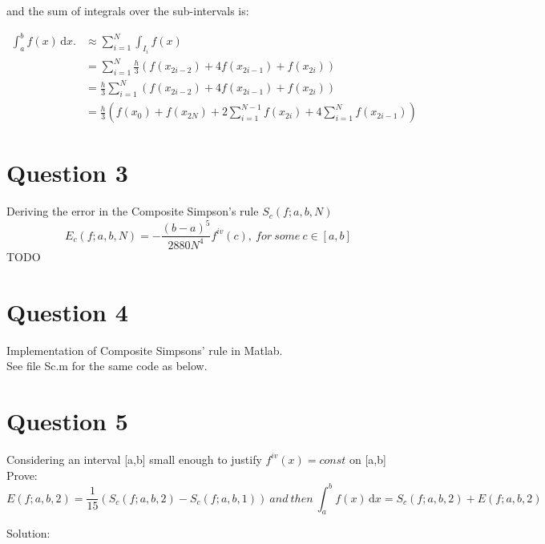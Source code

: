 \documentclass[fleqn]{report}
\begin{document}
and the sum of integrals over the sub-intervals is:

\begin{equation*}
\begin{split}
\int_a^b \! f(x) \,\mathrm{d}x. & \approx  \sum_{i=1}^{N} \int_{I_i} \! f(x) \,\\
& = \sum_{i=1}^{N} \frac{h}{3}(f(x_{2i-2}) + 4f(x_{2i-1}) + f(x_{2i}))\\
& = \frac{h}{3} \sum_{i=1}^{N} (f(x_{2i-2}) + 4f(x_{2i-1}) + f(x_{2i}))\\
& = \frac{h}{3} (f(x_0) + f(x_{2N}) +  2\sum_{i=1}^{N-1} f(x_{2i}) + 4\sum_{i=1}^{N} f(x_{2i-1}))
\end{split}
\end{equation*}    

\pagebreak

\section{Question 3}
Deriving the error in the Composite Simpson's rule $S_c(f;a,b,N)$
\begin{equation*}
E_c(f;a,b,N) = -\frac{(b-a)^5}{2880N^4}f^{iv}(c),\ for \ some \ c \in [a,b]
\end{equation*}
TODO

\pagebreak

\section{Question 4}
Implementation of Composite Simpsons' rule in Matlab. \\

See file Sc.m for the same code as below.



\pagebreak

\section{Question 5}
Considering an interval [a,b] small enough to justify $f^{iv}(x) = const$ on [a,b] Prove: 
\begin{equation*}
E(f;a,b,2) = \frac{1}{15}(S_c(f;a,b,2) - S_c(f;a,b,1))\ and\ then\ \int_a^b \! f(x) \, \mathrm{d}x  = S_c(f;a,b,2) + E(f;a,b,2)
\end{equation*}

\noindent Solution: \\
\end{document}
